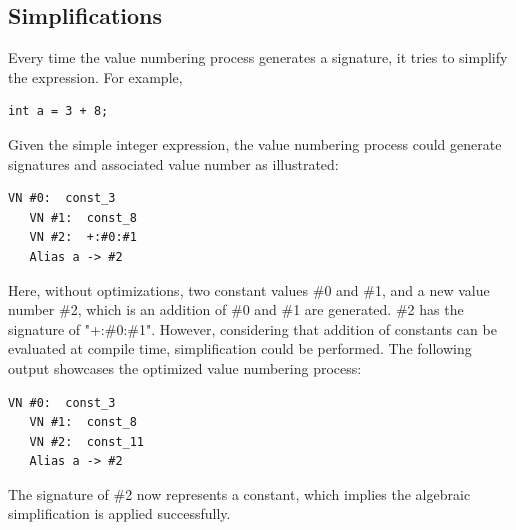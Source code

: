\subsection*{Simplifications}

Every time the value numbering process generates a signature, it tries to simplify the expression. For example,

\begin{lstlisting}[language=croqtile,caption={A constant expression}]
   int a = 3 + 8;
\end{lstlisting}

Given the simple integer expression, the value numbering process could generate signatures and associated value number as illustrated:

\begin{lstlisting}[language=croqtile,caption={The simplified graph}]
   VN #0:  const_3
   VN #1:  const_8
   VN #2:  +:#0:#1
   Alias a -> #2
\end{lstlisting}

Here, without optimizations, two constant values \#0 and \#1, and a new value number \#2, which is an addition of \#0 and \#1 are generated. \#2 has the signature of "+:\#0:\#1". However, considering that addition of constants can be evaluated at compile time, simplification could be performed. The following output showcases the optimized value numbering process:

\begin{lstlisting}[language=croqtile,caption={The folded graph}]
   VN #0:  const_3
   VN #1:  const_8
   VN #2:  const_11
   Alias a -> #2
\end{lstlisting}

The signature of \#2 now represents a constant, which implies the algebraic simplification is applied successfully.

